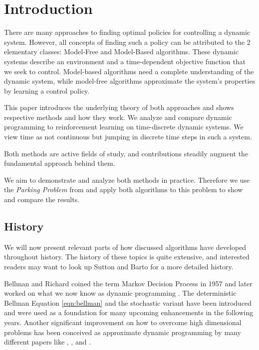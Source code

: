 
\chapter{Introduction}
\label{cha:introduction}

There are many approaches to finding optimal policies for controlling a dynamic system. However, all concepts of finding such a policy can be attributed to the 2 elementary classes: Model-Free and Model-Based algorithms. These dynamic systems describe an environment and a time-dependent objective function that we seek to control. Model-based algorithms need a complete understanding of the dynamic system, while model-free algorithms approximate the system's properties by learning a control policy.

This paper introduces the underlying theory of both approaches and shows respective methods and how they work.
We analyze and compare dynamic programming to reinforcement learning on time-discrete dynamic systems. We view time as not continuous but jumping in discrete time steps in such a system.

Both methods are active fields of study, and contributions steadily augment the fundamental approach behind them.

We aim to demonstrate and analyze both methods in practice. Therefore we use the \emph{Parking Problem} from \cite{bertsekas2019reinforcement} and apply both algorithms to this problem to show and compare the results. 

\section{History}
We will now present relevant parts of how discussed algorithms have developed throughout history. The history of these topics is quite extensive, and interested readers may want to look up Sutton and Barto \cite{sutton2018reinforcement} for a more detailed history.

Bellman and Richard coined the term Markov Decision Process \cite{bellman1957markovian} in 1957 and later worked on what we now know as dynamic programming \cite{bellman1966dynamic}. The deterministic Bellman Equation \ref{eqn:bellman} and the stochastic variant have been introduced and were used as a foundation for many upcoming enhancements in the following years. Another significant improvement on how to overcome high dimensional problems has been conceived as approximate dynamic programming by many different papers like \cite{si2004handbook}, \cite{powell2007approximate}, and \cite{bertsekas2008approximate}.

